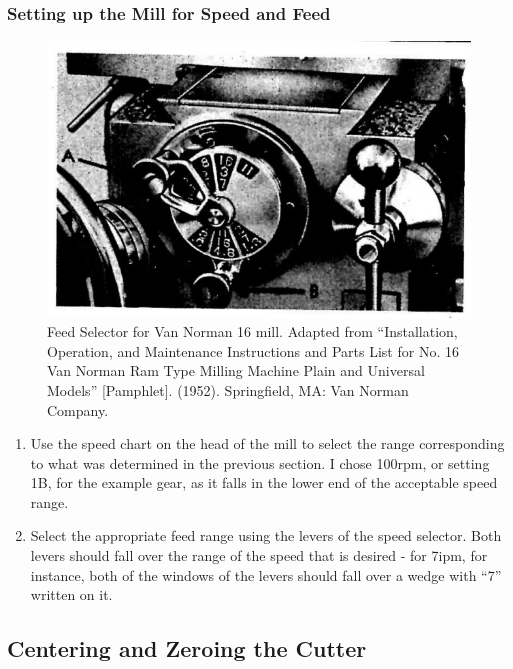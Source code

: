 \documentclass[12pt,twoside,letterpaper]{article}
\begin{document}
\subsubsection{Setting up the Mill for Speed and Feed}
\begin{figure}[H]
\centering
\includegraphics[width=5in]{feedSelect}
	\caption{Feed Selector for Van Norman 16 mill. Adapted from ``Installation, Operation, and Maintenance Instructions and Parts List for No. 16 Van Norman Ram Type Milling Machine Plain and Universal Models'' [Pamphlet]. (1952). Springfield, MA: Van Norman Company. }
\end{figure}
\begin{enumerate}
	\item Use the speed chart on the head of the mill to select the range corresponding to what was determined in the previous section. I chose 100rpm, or setting 1B, for the example gear, as it falls in the lower end of the acceptable speed range.
	\item Select the appropriate feed range using the levers of the speed selector. Both levers should fall over the range of the speed that is desired - for 7ipm, for instance, both of the windows of the levers should fall over a wedge with ``7'' written on it.
\end{enumerate}

\subsection{Centering and Zeroing the Cutter}
\end{document}
